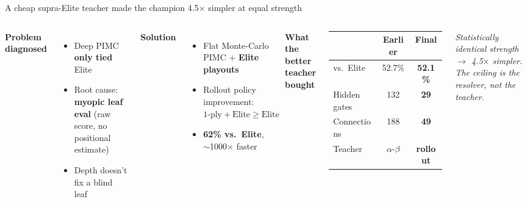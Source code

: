 \documentclass[10pt]{beamer}
\begin{document}
\begin{frame}{A cheap supra-Elite teacher made the champion 4.5$\times$ simpler at equal strength}
  \begin{columns}[T]
      \footnotesize
      \textbf{Problem diagnosed}\\[2pt]
      \begin{itemize}
        \item Deep PIMC \textbf{only tied} Elite
        \item Root cause: \textbf{myopic leaf eval} (raw score, no positional estimate)
        \item Depth doesn't fix a blind leaf
      \end{itemize}
      \vspace{4pt}
      \textbf{Solution}\\[2pt]
      \begin{itemize}
        \item Flat Monte-Carlo PIMC + \textbf{Elite playouts}
        \item Rollout policy improvement: $\text{1-ply} + \text{Elite} \ge \text{Elite}$
        \item \textbf{62\% vs.\ Elite}, $\sim$1000$\times$ faster
      \end{itemize}
      \centering
      \textbf{What the better teacher bought}\\[4pt]
      \begin{tabular}{@{}lcc@{}}
        \toprule
        & \textbf{Earlier} & \textbf{Final} \\
        \midrule
        vs.\ Elite     & 52.7\%           & \textbf{52.1\%} \\
        Hidden gates   & 132              & \textbf{29} \\
        Connections    & 188              & \textbf{49} \\
        Teacher        & $\alpha$-$\beta$ & \textbf{rollout} \\
        \bottomrule
      \end{tabular}
      \centering
      \small\emph{Statistically identical strength $\rightarrow$ 4.5$\times$ simpler. The ceiling is the resolver, not the teacher.}
  \end{columns}
\end{frame}
\end{document}
